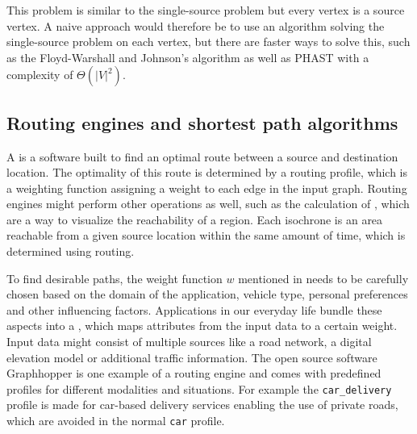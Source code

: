 		\subsubsection{}
		\label{subsubsec:all-pair-shortest-path}
		
			This problem is similar to the single-source problem but every vertex is a source vertex.
			A naive approach would therefore be to use an algorithm solving the single-source problem on each vertex, but there are faster ways to solve this, such as the Floyd-Warshall and Johnson's algorithm\cite[693,700]{cormen-introduction-to-alg} as well as PHAST\cite{bast-transportation-networks} with a complexity of $\Theta(|V|^2)$.
		
	\subsection{Routing engines and shortest path algorithms}
	\label{subsec:routing-engines}
		
		A  is a software built to find an optimal route between a source and destination location.
		The optimality of this route is determined by a routing profile, which is a weighting function assigning a weight to each edge in the input graph.
		Routing engines might perform other operations as well, such as the calculation of , which are a way to visualize the reachability of a region\cite{allen-isochrones}.
		Each isochrone is an area reachable from a given source location within the same amount of time, which is determined using routing.
		
		To find desirable paths, the weight function $w$ mentioned in  needs to be carefully chosen based on the domain of the application, vehicle type, personal preferences and other influencing factors.
		Applications in our everyday life bundle these aspects into a , which maps attributes from the input data to a certain weight.
		Input data might consist of multiple sources like a road network, a digital elevation model or additional traffic information.
		The open source software Graphhopper is one example of a routing engine and comes with predefined profiles for different modalities and situations.
		For example the \texttt{car\_delivery} profile is made for car-based delivery services enabling the use of private roads\cite{graphhopper-routing-profiles}, which are avoided in the normal \texttt{car} profile.
		
